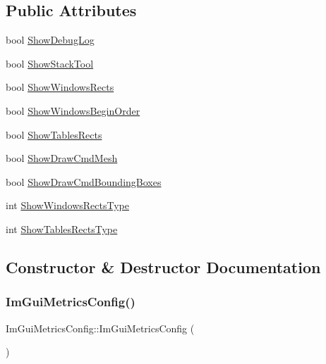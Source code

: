 \subsection*{Public Attributes}
\begin{DoxyCompactItemize}
\item 
bool \hyperlink{structImGuiMetricsConfig_a5e637464de86ff6692dc730b220b7202}{Show\+Debug\+Log}
\item 
bool \hyperlink{structImGuiMetricsConfig_afa80556717003dc548dc7d915c70a648}{Show\+Stack\+Tool}
\item 
bool \hyperlink{structImGuiMetricsConfig_a8a87adc63e607b6e96a82ed60fbeb027}{Show\+Windows\+Rects}
\item 
bool \hyperlink{structImGuiMetricsConfig_acebcecb922457f3cacee40fba2d249c9}{Show\+Windows\+Begin\+Order}
\item 
bool \hyperlink{structImGuiMetricsConfig_ab26775b8699841443de659a2364116a7}{Show\+Tables\+Rects}
\item 
bool \hyperlink{structImGuiMetricsConfig_a66b6a4e19bb9c307d379d3172154d6a2}{Show\+Draw\+Cmd\+Mesh}
\item 
bool \hyperlink{structImGuiMetricsConfig_a47db2daf9b53e765a41e76bcc46a3e94}{Show\+Draw\+Cmd\+Bounding\+Boxes}
\item 
int \hyperlink{structImGuiMetricsConfig_a227d685106a6496fc3ddec60af5278e1}{Show\+Windows\+Rects\+Type}
\item 
int \hyperlink{structImGuiMetricsConfig_a6cba724d2914e668a0d07e590e2bbac2}{Show\+Tables\+Rects\+Type}
\end{DoxyCompactItemize}


\subsection{Constructor \& Destructor Documentation}
\mbox{\label{structImGuiMetricsConfig_a7b531b4106a6f34ce645a3969b213920}} 
\subsubsection{\texorpdfstring{Im\+Gui\+Metrics\+Config()}{ImGuiMetricsConfig()}}
{\footnotesize\ttfamily Im\+Gui\+Metrics\+Config\+::\+Im\+Gui\+Metrics\+Config (\begin{DoxyParamCaption}{ }\end{DoxyParamCaption})\hspace{0.3cm}{\ttfamily [inline]}}



